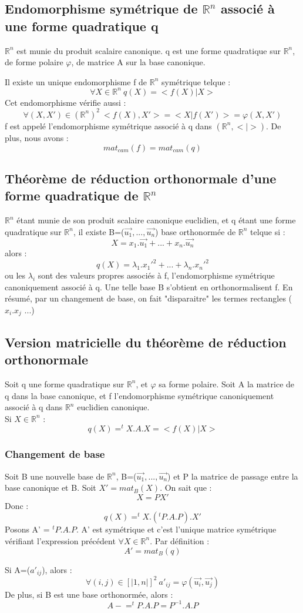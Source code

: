 \subsection{Endomorphisme symétrique de $\mathbb{R}^n$ associé à une forme quadratique q}
$\mathbb{R}^n$ est munie du produit scalaire canonique. q est une forme quadratique sur $\mathbb{R}^n$, de forme polaire $\varphi$, de matrice A sur la base canonique.
\begin{prop}
Il existe un unique endomorphisme f de $\mathbb{R}^n$ symétrique telque : 
$$\forall X \in \mathbb{R}^n~ q(X) = <f(X)| X >$$
Cet endomorphisme vérifie aussi : 
$$\forall (X,X') \in (\mathbb{R}^n)^2~ <f(X),X'> = <X|f(X')> = \varphi(X,X')$$
f est appelé l'endomorphisme symétrique associé à q dans $(\mathbb{R}^n,<|>)$. De plus, nous avons : 
$$mat_{cam}(f)=mat_{cam}(q)$$
\end{prop}
\subsection{Théorème de réduction orthonormale d'une forme quadratique de $\mathbb{R}^n$}
\begin{theo}
$\mathbb{R}^n$ étant munie de son produit scalaire canonique euclidien, et q étant une forme quadratique sur $\mathbb{R}^n$, il existe B=($\overrightarrow{u_1},...,\overrightarrow{u_n}$) base orthonormée de $\mathbb{R}^n$ telque si :
$$X = x_1.\overrightarrow{u_1} + ... + x_n.\overrightarrow{u_n}$$
alors : 
$$q(X) = \lambda_1.x_1'^2 + ... + \lambda_n.x_n'^2$$
ou les $\lambda_i$ sont des valeurs propres associés à f, l'endomorphisme symétrique canoniquement associé à q. Une telle base B s'obtient en orthonormalisent f. En résumé, par un changement de base, on fait "disparaitre" les termes rectangles ($x_i.x_j$ ...)
\end{theo}
\subsection{Version matricielle du théorème de réduction orthonormale}
Soit q une forme quadratique sur $\mathbb{R}^n$, et $\varphi$ sa forme polaire. Soit A la matrice de q dans la base canonique, et f l'endomorphisme symétrique canoniquement associé à q dans $\mathbb{R}^n$ euclidien canonique.\\
Si $X \in \mathbb{R}^n$ : 
$$q(X) = ^tX.A.X = <f(X) | X>$$
\subsubsection{Changement de base}
Soit B une nouvelle base de $\mathbb{R}^n$, B=($\overrightarrow{u_1},...,\overrightarrow{u_n}$) et P la matrice de passage entre la base canonique et B. Soit $X' = mat_B(X)$. On sait que : 
$$X = PX'$$
Donc : 
$$q(X) = ^tX.(^tP.A.P).X'$$
Posons A' = $^tP.A.P$. A' est symétrique et c'est l'unique matrice symétrique vérifiant l'expression précédent $\forall X \in \mathbb{R}^n$. Par définition : 
$$A' = mat_B(q)$$
\begin{prop}
Si A=($a'_{ij}$), alors :
$$\forall (i,j) \in [|1,n|]^2~a'_{ij} = \varphi(\overrightarrow{u_i},\overrightarrow{u_j}) $$
De plus, si B est une base orthonormée, alors : 
$$A- = ^tP.A.P = P^{-1}.A.P$$
\end{prop}

